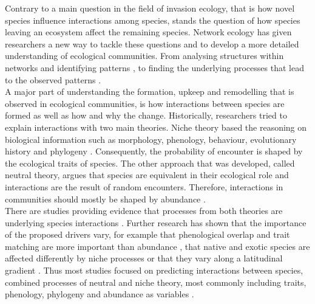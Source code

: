 \documentclass[12pt,a4paper]{article}
\begin{document}


Contrary to a main question in the field of invasion ecology, that is how novel species influence interactions among species, stands the question of how species leaving an ecosystem affect the remaining species. Network ecology has given researchers a new way to tackle these questions and to develop a more detailed understanding of ecological communities. From analysing structures within networks and identifying patterns \parencite{Jordano1987, Dunne2002}, %
to finding the underlying processes that lead to the observed patterns \parencite{Rezende2007, Vazquez2009, Thebault2010}.\\
A major part of understanding the formation, upkeep and remodelling that is observed in ecological communities, is how interactions between species are formed as well as how and why the change. Historically, researchers tried to explain interactions with two main theories. Niche theory based the reasoning on biological information such as morphology, phenology, behaviour, evolutionary history and phylogeny \parencite{Webb2002, Jordano2003, Vazquez2009}. %
Consequently, the probability of encounter is shaped by the ecological traits of species.
The other approach that was developed, called neutral theory, argues that species are equivalent in their ecological role and interactions are the result of random encounters. Therefore, interactions in communities should mostly be shaped by abundance \parencite{Vazquez2005, Vazquez2007}.\\
There are studies providing evidence that processes from both theories are underlying species interactions \parencite{Vazquez2009a, Verdu2011}. Further research has shown that the importance of the proposed drivers vary, for example that phenological overlap and trait matching are more important than abundance \parencite{Vizentin-Bugoni2014}, that native and exotic species are affected differently by niche processes \parencite{Peralta2020} or that they vary along a latitudinal gradient \parencite{Sonne2020}. Thus most studies focused on predicting interactions between species, combined processes of neutral and niche theory, most commonly including traits, phenology, phylogeny and abundance as variables \parencite{Pearse2013, Olito2015, Morente-Lopez2018, Kotula2021, Benadi2022}.\\
\end{document}
